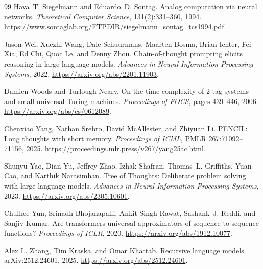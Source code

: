 \documentclass[11pt,twoside]{article}
\theoremstyle{definition}
\theoremstyle{remark}
\begin{document}
\begin{thebibliography}{99}
Hava~T. Siegelmann and Eduardo~D. Sontag.
\newblock Analog computation via neural networks.
\newblock \emph{Theoretical Computer Science}, 131(2):331--360, 1994.
\newblock \url{https://www.sontaglab.org/FTPDIR/siegelmann_sontag_tcs1994.pdf}.

Jason Wei, Xuezhi Wang, Dale Schuurmans, Maarten Bosma, Brian Ichter,
Fei Xia, Ed Chi, Quoc Le, and Denny Zhou.
\newblock Chain-of-thought prompting elicits reasoning in large language models.
\newblock \emph{Advances in Neural Information Processing Systems}, 2022.
\newblock \url{https://arxiv.org/abs/2201.11903}.

Damien Woods and Turlough Neary.
\newblock On the time complexity of 2-tag systems and small universal Turing
machines.
\newblock \emph{Proceedings of FOCS}, pages 439--446, 2006.
\newblock \url{https://arxiv.org/abs/cs/0612089}.

Chenxiao Yang, Nathan Srebro, David McAllester, and Zhiyuan Li.
\newblock PENCIL: Long thoughts with short memory.
\newblock \emph{Proceedings of ICML}, PMLR 267:71092--71156, 2025.
\newblock \url{https://proceedings.mlr.press/v267/yang25ac.html}.

Shunyu Yao, Dian Yu, Jeffrey Zhao, Izhak Shafran, Thomas~L. Griffiths,
Yuan Cao, and Karthik Narasimhan.
\newblock Tree of Thoughts: Deliberate problem solving with large language models.
\newblock \emph{Advances in Neural Information Processing Systems}, 2023.
\newblock \url{https://arxiv.org/abs/2305.10601}.

Chulhee Yun, Srinadh Bhojanapalli, Ankit Singh Rawat, Sashank~J. Reddi,
and Sanjiv Kumar.
\newblock Are transformers universal approximators of sequence-to-sequence functions?
\newblock \emph{Proceedings of ICLR}, 2020.
\newblock \url{https://arxiv.org/abs/1912.10077}.

Alex L. Zhang, Tim Kraska, and Omar Khattab.
\newblock Recursive language models.
\newblock arXiv:2512.24601, 2025.
\newblock \url{https://arxiv.org/abs/2512.24601}.

\end{thebibliography}
\end{document}
